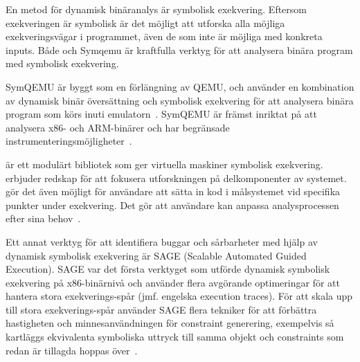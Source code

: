 En metod för dynamisk binäranalys är symbolisk exekvering. Eftersom exekveringen är symbolisk är 
det möjligt att utforska alla möjliga exekveringsvägar i programmet, även de som inte är möjliga
med konkreta inputs. Både \stoe{} och Symqemu är kraftfulla verktyg för att analysera binära program 
med symbolisk exekvering.

SymQEMU är byggt som en förlängning av QEMU, och använder en kombination av dynamisk binär 
översättning och symbolisk exekvering för att analysera binära program som körs inuti emulatorn~\cite{symqemu}.
SymQEMU är främst inriktat på att analysera x86- och ARM-binärer och har begränsade instrumenteringsmöjligheter~\cite{symbexec}.

\stoe{} är ett modulärt bibliotek som ger virtuella maskiner symbolisk exekvering. \stoe{} erbjuder 
redskap för att fokusera utforskningen på delkomponenter av systemet. \stoe{} gör det även 
möjligt för användare att sätta in kod i målsystemet vid specifika punkter under 
exekvering. Det gör att användare kan anpassa analysprocessen efter sina behov~\cite{s2e}. 

Ett annat verktyg för att identifiera buggar och sårbarheter med hjälp av dynamisk symbolisk 
exekvering är SAGE (Scalable Automated Guided Execution).
SAGE var det första verktyget som utförde dynamisk symbolisk exekvering på x86-binärnivå och använder flera 
avgörande optimeringar för att hantera stora exekverings-spår (jmf. engelska execution traces).
För att skala upp till stora exekverings-spår använder SAGE flera tekniker för att förbättra hastigheten och 
minnesanvändningen för constraint generering, exempelvis så kartläggs ekvivalenta symboliska uttryck till samma 
objekt och constraints som redan är tillagda hoppas över~\cite{sage}.